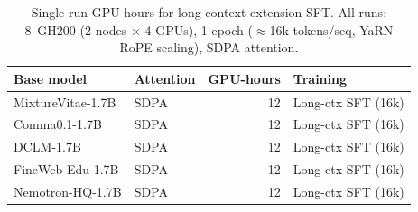 
\begin{table}[htbp]
\centering
\caption{Single-run GPU-hours for long-context extension SFT.
All runs: 8~GH200 (2 nodes $\times$ 4 GPUs), 1 epoch ($\approx$16k tokens/seq, YaRN RoPE scaling), SDPA attention.}  \label{tab:long_ctx_extension_gpu_hours}
\begin{tabular}{llrl}
\toprule
Base model & Attention & GPU-hours & Training \\
\midrule 
MixtureVitae-1.7B  & SDPA & 12 & Long-ctx SFT (16k) \\
Comma0.1-1.7B      & SDPA & 12 & Long-ctx SFT (16k) \\
DCLM-1.7B           & SDPA & 12 & Long-ctx SFT (16k) \\
FineWeb-Edu-1.7B    & SDPA & 12 & Long-ctx SFT (16k) \\
Nemotron-HQ-1.7B    & SDPA & 12 & Long-ctx SFT (16k) \\
\bottomrule
\end{tabular}
\end{table}





\clearpage
